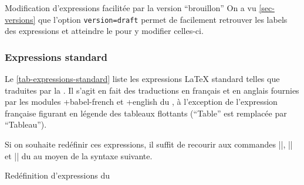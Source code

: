 \begin{dbremark}{Modification d'expressions facilitée par la version
    \enquote{brouillon}}{}
  On a vu \vref{sec-versions} que l'option
  \lstinline[deletekeywords={version}]|version=draft| permet de facilement
  retrouver les labels des expressions et atteindre le \File{\configurationfile}
  pour y modifier celles-ci.
\end{dbremark}

\subsubsection{Expressions standard}
\label{sec-expressions-standard}%
%

Le \vref{tab-expressions-standard} liste les expressions \LaTeX{} standard
telles que traduites par la \yatCl{}. Il s'agit en fait des traductions en
français et en anglais fournies par les modules \package*+{babel-french} et
\package*+{english} du , à l'exception de l'expression française
figurant en légende des tableaux flottants (\enquote{Table} est remplacée par
\enquote{Tableau}).%
%

Si on souhaite redéfinir ces expressions, il suffit de recourir aux commandes
|\addto|, |\captionsfrench| et |\captionsenglish| du  au moyen
de la syntaxe suivante.

\begin{preamblecode}[title=Par exemple dans le \File{\configurationfile}]
\addto{}
\addto{}
\end{preamblecode}
\begin{table}[hb]
  \centering
  \caption{Valeurs et commandes d'expressions \LaTeX{} standard fournies par la \yatCl{}}
  \label{tab-expressions-standard}
  
\end{table}
%
\begin{dbexample}{Redéfinition d'expressions du }{}
\begin{preamblecode}[title=Redéfinition des expressions pour les résumés]
\addto{}
\addto{}
\end{preamblecode}
\end{dbexample}

